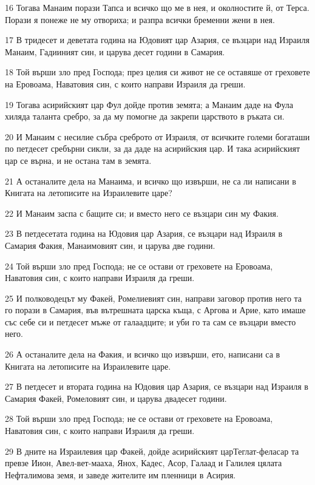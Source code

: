 \par 16 Тогава Манаим порази Тапса и всичко що ме в нея, и околностите й, от Терса. Порази я понеже не му отвориха; и разпра всички бременни жени в нея.
\par 17 В тридесет и деветата година на Юдовият цар Азария, се възцари над Израиля Манаим, Гадииният син, и царува десет години в Самария.
\par 18 Той върши зло пред Господа; през целия си живот не се оставяше от греховете на Еровоама, Наватовия син, с които направи Израиля да греши.
\par 19 Тогава асирийският цар Фул дойде против земята; а Манаим даде на Фула хиляда таланта сребро, за да му помогне да закрепи царството в ръката си.
\par 20 И Манаим с несилие събра среброто от Израиля, от всичките големи богаташи по петдесет сребърни сикли, за да даде на асирийския цар. И така асирийският цар се върна, и не остана там в земята.
\par 21 А останалите дела на Манаима, и всичко що извърши, не са ли написани в Книгата на летописите на Израилевите царе?
\par 22 И Манаим заспа с бащите си; и вместо него се възцари син му Факия.
\par 23 В петдесетата година на Юдовия цар Азария, се възцари над Израиля в Самария Факия, Манаимовият син, и царува две години.
\par 24 Той върши зло пред Господа; не се остави от греховете на Еровоама, Наватовия син, с които направи Израиля да греши.
\par 25 И полководецът му Факей, Ромелиевият син, направи заговор против него та го порази в Самария, във вътрешната царска къща, с Аргова и Арие, като имаше със себе си и петдесет мъже от галаадците; и уби го та сам се възцари вместо него.
\par 26 А останалите дела на Факия, и всичко що извърши, ето, написани са в Книгата на летописите на Израилевите царе.
\par 27 В петдесет и втората година на Юдовия цар Азария, се възцари над Израиля в Самария Факей, Ромеловият син, и царува двадесет години.
\par 28 Той върши зло пред Господа; не се остави от греховете на Еровоама, Наватовия син, с които направи Израиля да греши.
\par 29 В дните на Израилевия цар Факей, дойде асирийският царТеглат-феласар та превзе Иион, Авел-вет-мааха, Янох, Кадес, Асор, Галаад и Галилея цялата Нефталимова земя, и заведе жителите им пленници в Асирия.

